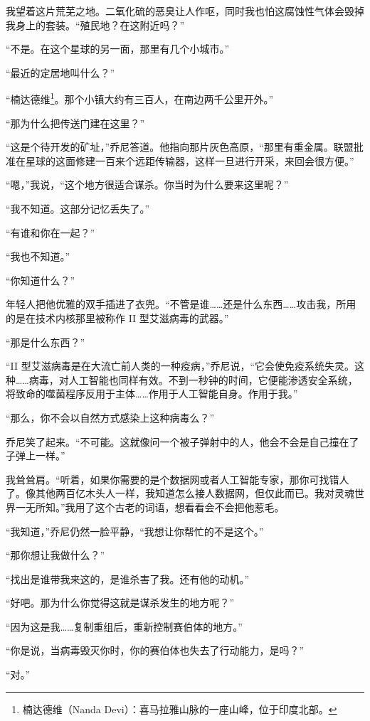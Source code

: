 \documentclass[AutoFakeBold=true]{book}
\begin{document}
我望着这片荒芜之地。二氧化硫的恶臭让人作呕，同时我也怕这腐蚀性气体会毁掉我身上的套装。``殖民地？在这附近吗？''

``不是。在这个星球的另一面，那里有几个小城市。''

``最近的定居地叫什么？''

``楠达德维\footnote{楠达德维（Nanda Devi）：喜马拉雅山脉的一座山峰，位于印度北部。}。那个小镇大约有三百人，在南边两千公里开外。''

``那为什么把传送门建在这里？''

``这是个待开发的矿址，''乔尼答道。他指向那片灰色高原，``那里有重金属。联盟批准在星球的这面修建一百来个远距传输器，这样一旦进行开采，来回会很方便。''

``嗯，''我说，``这个地方很适合谋杀。你当时为什么要来这里呢？''

``我不知道。这部分记忆丢失了。''

``有谁和你在一起？''

``我也不知道。''

``你知道什么？''

年轻人把他优雅的双手插进了衣兜。``不管是谁……还是什么东西……攻击我，所用的是在技术内核那里被称作 II 型艾滋病毒的武器。''

``那是什么东西？''

``II 型艾滋病毒是在大流亡前人类的一种疫病，''乔尼说，``它会使免疫系统失灵。这种……病毒，对人工智能也同样有效。不到一秒钟的时间，它便能渗透安全系统，将致命的噬菌程序反用于主体……作用于人工智能自身。作用于我。''

``那么，你不会以自然方式感染上这种病毒么？''

乔尼笑了起来。``不可能。这就像问一个被子弹射中的人，他会不会是自己撞在了子弹上一样。''

我耸耸肩。``听着，如果你需要的是个数据网或者人工智能专家，那你可找错人了。像其他两百亿木头人一样，我知道怎么接人数据网，但仅此而已。我对灵魂世界一无所知。''我用了这个古老的词语，想看看会不会把他惹毛。

``我知道，''乔尼仍然一脸平静，``我想让你帮忙的不是这个。''

``那你想让我做什么？''

``找出是谁带我来这的，是谁杀害了我。还有他的动机。''

``好吧。那为什么你觉得这就是谋杀发生的地方呢？''

``因为这是我……复制重组后，重新控制赛伯体的地方。''

``你是说，当病毒毁灭你时，你的赛伯体也失去了行动能力，是吗？''

``对。''
\end{document}

